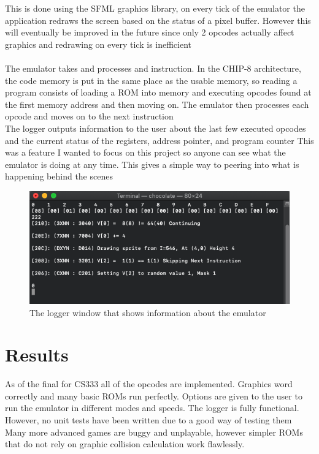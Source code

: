\documentclass[12pt]{IEEEtran}
\begin{document}
This is done using the SFML graphics library, on every tick of the emulator the application redraws the screen based on the status of a pixel buffer.
However this will eventually be improved in the future since only 2 opcodes actually affect graphics and redrawing on every tick is inefficient
\\
\\The emulator takes and processes and instruction. In the CHIP-8 architecture, the code memory is put in the same place as the usable memory, so reading a program consists of
loading a ROM into memory and executing opcodes found at the first memory address and then moving on. The emulator then processes each opcode and moves on to the next instruction
\\
The logger outputs information to the user about the last few executed opcodes and the current status of the registers, address pointer, and program counter
This was a feature I wanted to focus on this project so anyone can see what the emulator is doing at any time. This gives a simple way to peering into what is happening behind the scenes
\begin{figure}[h]
    \includegraphics[width=\linewidth]{logger.png}
    \caption{The logger window that shows information about the emulator}
\end{figure}


\section{Results}
As of the final for CS333 all of the opcodes are implemented. Graphics word correctly and many basic ROMs run perfectly.
Options are given to the user to run the emulator in different modes and speeds. The logger is fully functional. However, no unit tests have been written due to a good way of testing them
Many more advanced games are buggy and unplayable, however simpler ROMs that do not rely on graphic collision calculation work flawlessly.
\end{document}
